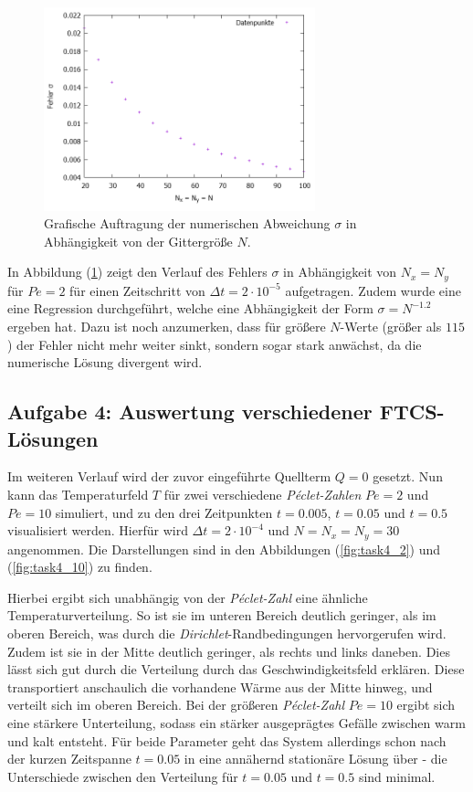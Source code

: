 \documentclass[12pt,a4paper,titlepage,headinclude,bibtotoc]{scrartcl}
\begin{document}
\begin{figure}[H]
 \centering
   \includegraphics[width=0.7\textwidth]{res/task3.png}
   \caption{Grafische Auftragung der numerischen Abweichung $\sigma$ in Abhängigkeit von der Gittergröße $N$.}
 \label{fig:task3}
\end{figure}

In Abbildung (\ref{fig:task3}) zeigt den Verlauf des Fehlers $\sigma$ in Abhängigkeit von $N_x = N_y$ für $Pe = 2$ für einen Zeitschritt von $\Delta t = 2 \cdot 10^{-5}$ aufgetragen.
Zudem wurde eine eine Regression durchgeführt, welche eine Abhängigkeit der Form $\sigma = N^{-1.2}$ ergeben hat. Dazu ist noch anzumerken, dass für größere $N$-Werte (größer als $115$) der Fehler nicht mehr weiter sinkt, sondern sogar stark anwächst, da die numerische Lösung divergent wird.


\subsection{Aufgabe 4: Auswertung verschiedener FTCS-Lösungen}
\label{sec:task4}
Im weiteren Verlauf wird der zuvor eingeführte Quellterm $Q=0$ gesetzt. Nun kann das Temperaturfeld $T$ für zwei verschiedene \textit{Péclet-Zahlen} $Pe = 2$ und $Pe = 10$ simuliert,
und zu den drei Zeitpunkten $t = 0.005$, $t = 0.05$ und $t=0.5$ visualisiert werden. Hierfür wird $\Delta t = 2 \cdot 10^{-4}$ und $N=N_x=N_y = 30$ angenommen. Die Darstellungen sind in den Abbildungen (\ref{fig:task4_2}) und (\ref{fig:task4_10}) zu finden.

Hierbei ergibt sich unabhängig von der \textit{Péclet-Zahl} eine ähnliche Temperaturverteilung. So ist sie im unteren Bereich deutlich geringer, als im oberen Bereich, was durch die \textit{Dirichlet}-Randbedingungen hervorgerufen wird. Zudem ist sie in der Mitte deutlich geringer, als rechts und links daneben. Dies lässt sich gut durch die Verteilung durch das Geschwindigkeitsfeld erklären. Diese transportiert anschaulich die vorhandene Wärme aus der Mitte hinweg, und verteilt sich im oberen Bereich. Bei der größeren \textit{Péclet-Zahl} $Pe=10$ ergibt sich eine stärkere Unterteilung, sodass ein stärker ausgeprägtes Gefälle zwischen warm und kalt entsteht. Für beide Parameter geht das System allerdings schon nach der kurzen Zeitspanne $t = 0.05$ in eine annähernd stationäre Lösung über - die Unterschiede zwischen den Verteilung für $t=0.05$ und $t=0.5$ sind minimal. 
\end{document}
